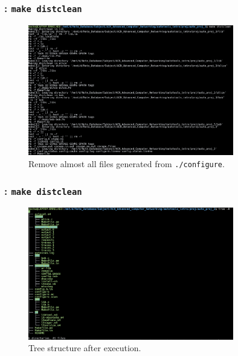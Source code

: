 \begin{frame}
    \frametitle{: \texttt{make distclean}}

    \begin{figure}[H]
        \centering
        \includegraphics[width=0.8\textwidth]{../figure/autotool_12.png}
        \caption*{Remove almost all files generated from \texttt{./configure}.}
    \end{figure}
\end{frame}

\begin{frame}
    \frametitle{: \texttt{make distclean}}

    \begin{figure}[H]
        \centering
        \includegraphics[width=0.8\textwidth]{../figure/autotool_13.png}
        \caption*{Tree structure after execution.}
    \end{figure}
\end{frame}
